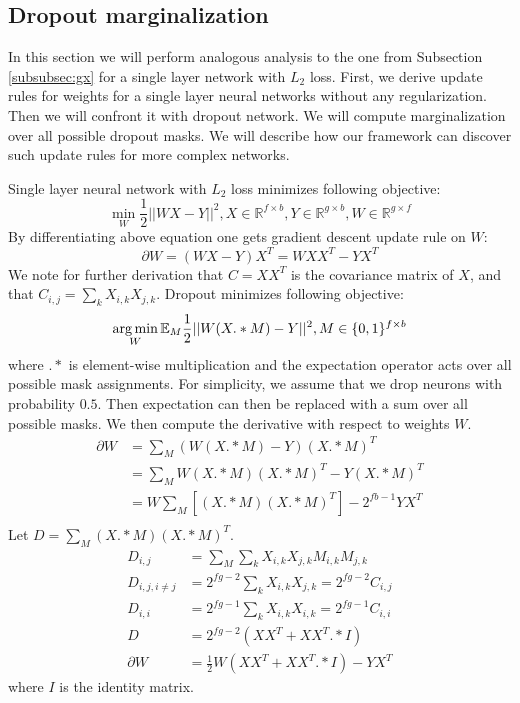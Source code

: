 \subsection{Dropout marginalization}\label{sec:dropout}
In this section we will perform analogous analysis to the one from Subsection \ref{subsubsec:gx} 
for a single layer network with $L_2$ loss. 
First, we derive update rules for weights for a single layer neural networks without any regularization. Then
we will confront it with dropout network. We will compute marginalization over
all possible dropout masks.
We will describe how our framework can discover
such update rules for more complex networks.

Single layer neural network with $L_2$ loss minimizes following objective:
\begin{equation*}
  \min_W \frac{1}{2} ||WX - Y||^2, X \in \mathbb{R}^{f \times b}, Y \in \mathbb{R}^{g \times b}, W \in \mathbb{R}^{g \times f}
\end{equation*}
By differentiating above equation one gets gradient descent update rule
on $W$:
\begin{equation*}
 \partial W = (WX - Y)X^T  = WXX^T - YX^T
\end{equation*}
We note for further derivation that $C = XX^T$ is the covariance matrix of
$X$, and that $C_{i,j} = \sum_k X_{i, k}X_{j, k}$.
Dropout minimizes following objective:
\begin{equation*}
  \operatorname*{arg\,min}_W \mathbb{E}_M \frac{1}{2}||W(X .* M) - Y||^2, M \in \{0, 1\}^{f \times b}
\end{equation*}
where $.*$ is element-wise multiplication and the expectation operator
acts over all possible mask assignments. For simplicity, we assume
that we drop neurons with probability $0.5$. Then expectation can then
be replaced with a sum over all possible masks. We then compute the
derivative with respect to weights $W$.
\begin{align*}
  \partial W & = \sum_M (W(X .* M) - Y)(X .* M)^T \\
  & = \sum_M W(X .* M)(X .* M)^T - Y(X .* M)^T\\
  & = W\sum_M [(X .* M)(X .* M)^T] - 2^{fb - 1}YX^T\\
\end{align*}
Let  $D = \sum_M (X .* M)(X .* M)^T$. 
\begin{align*}
  D_{i,j} & = \sum_M \sum_k X_{i, k} X_{j, k} M_{i, k} M_{j, k} \\
  D_{i,j, i \neq j} & = 2^{fg - 2} \sum_k X_{i, k} X_{j, k} = 2^{fg - 2}C_{i, j} \\
  D_{i, i} & = 2^{fg - 1} \sum_k X_{i, k} X_{i, k} = 2^{fg - 1}C_{i, i} \\
  D & = 2^{fg - 2}(XX^T + XX^T .* I) \\
  \partial W & = \frac{1}{2}W (XX^T + XX^T .* I) - YX^T
\end{align*}
where $I$ is the identity matrix. 


